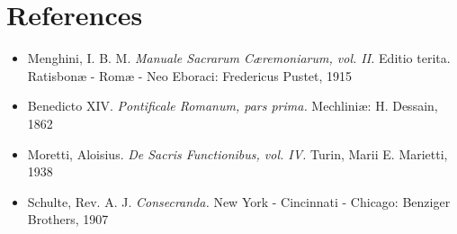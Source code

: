 \documentclass[letterpaper, twocolumn]{article}
\begin{document}
\section*{References}
\begin{itemize}
	\item Menghini, I. B. M. \textit{Manuale Sacrarum Cæremoniarum, vol. II.} Editio terita. Ratisbonæ - Romæ - Neo Eboraci: Fredericus Pustet, 1915
	\item Benedicto XIV. \textit{Pontificale Romanum, pars prima.} Mechliniæ: H. Dessain, 1862
	\item Moretti, Aloisius. \textit{De Sacris Functionibus, vol. IV.} Turin, Marii E. Marietti, 1938
	\item Schulte, Rev. A. J. \textit{Consecranda.} New York - Cincinnati - Chicago: Benziger Brothers, 1907
\end{itemize}
\end{document}
